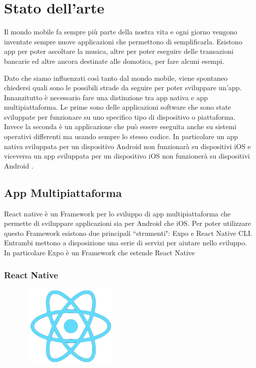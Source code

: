 \chapter{Stato dell'arte}
Il mondo mobile fa sempre pi\`u parte della nostra vita e ogni giorno vengono inventate sempre nuove applicazioni che permettono di semplificarla. Esistono app
per poter ascoltare la musica, altre per poter eseguire delle transazioni bancarie ed altre ancora destinate alle domotica, per fare alcuni esempi.

Dato che siamo influenzati cos\`i tanto dal mondo mobile, viene spontaneo chiedersi quali sono le possibili strade da seguire per poter sviluppare un'app.
Innanzitutto \`e necessario fare una distinzione tra app nativa e app multipiattaforma.
Le prime sono delle applicazioni software che sono state sviluppate per funzionare su uno
specifico tipo di dispositivo o piattaforma. Invece la seconda \`e un applicazione che pu\`o essere eseguita anche su sistemi operativi differenti ma usando sempre lo stesso codice.
In particolare un app nativa sviluppata per un dispositivo Android non funzionar\`a su dispositivi iOS e viceversa un app sviluppata
per un dispositivo iOS non funzioner\`a su dispositivi Android \cite{ReactNativeCLI:Expo} \cite{app:ibride:native}.\\

\section{App Multipiattaforma}
React native \`e un Framework per lo sviluppo di app multipiattaforma che permette di sviluppare applicazioni sia per Android che iOS.
Per poter utilizzare questo Framework esistono due principali ``strumenti": Expo\cite{ReactNativeCLI:Expo} e React Native CLI\cite{ReactNativeCLI:Expo}.
Entrambi mettono a disposizione una serie di servizi per aiutare nello sviluppo. In particolare Expo \`e un Framework che estende React Native
\subsection{React Native}
\begin{figure}[h]
      \centering
      \includegraphics[width=5cm, height=4cm]{images/ReactNativeLogo-NoBackground.png}
      \caption[differenzeiteot]{}
      \label{fig:ReactNative}
\end{figure}

